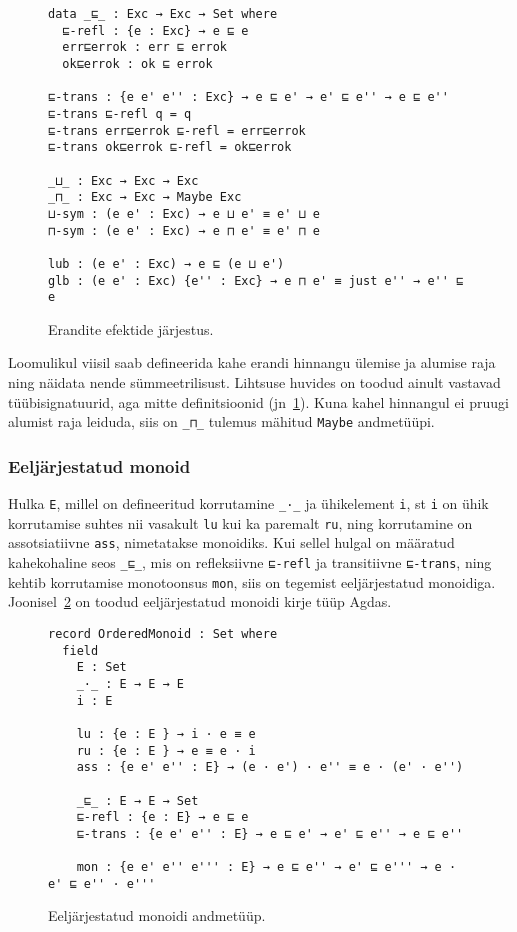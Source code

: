 \documentclass[a4paper,12pt]{article}
\begin{document}
\begin{figure}
  \begin{BVerbatim}
data _⊑_ : Exc → Exc → Set where
  ⊑-refl : {e : Exc} → e ⊑ e
  err⊑errok : err ⊑ errok
  ok⊑errok : ok ⊑ errok
  
⊑-trans : {e e' e'' : Exc} → e ⊑ e' → e' ⊑ e'' → e ⊑ e''
⊑-trans ⊑-refl q = q
⊑-trans err⊑errok ⊑-refl = err⊑errok
⊑-trans ok⊑errok ⊑-refl = ok⊑errok

_⊔_ : Exc → Exc → Exc
_⊓_ : Exc → Exc → Maybe Exc
⊔-sym : (e e' : Exc) → e ⊔ e' ≡ e' ⊔ e
⊓-sym : (e e' : Exc) → e ⊓ e' ≡ e' ⊓ e

lub : (e e' : Exc) → e ⊑ (e ⊔ e')
glb : (e e' : Exc) {e'' : Exc} → e ⊓ e' ≡ just e'' → e'' ⊑ e
  \end{BVerbatim}
  \caption{Erandite efektide järjestus.}
  \label{fig:exc.ord}
\end{figure}
Loomulikul viisil saab defineerida kahe erandi hinnangu ülemise ja alumise raja ning näidata nende sümmeetrilisust.
Lihtsuse huvides on toodud ainult vastavad tüübisignatuurid, aga mitte definitsioonid (jn~\ref{fig:exc.ord}).
Kuna kahel hinnangul ei pruugi alumist raja leiduda, siis on {\tt _⊓_} tulemus mähitud {\tt Maybe} andmetüüpi.

\subsubsection{Eeljärjestatud monoid}\label{sssec:ordered-monoid}
Hulka {\tt E}, millel on defineeritud korrutamine {\tt _·_} ja ühikelement {\tt i},
st {\tt i} on ühik korrutamise suhtes nii vasakult {\tt lu} kui ka paremalt {\tt ru},
ning korrutamine on assotsiatiivne {\tt ass}, nimetatakse monoidiks.
Kui sellel hulgal on määratud kahekohaline seos {\tt _⊑_},
mis on refleksiivne {\tt ⊑-refl} ja transitiivne {\tt ⊑-trans},
ning kehtib korrutamise monotoonsus {\tt mon},
siis on tegemist eeljärjestatud monoidiga.
Joonisel~\ref{fig:ordered-monoid} on toodud eeljärjestatud monoidi kirje tüüp Agdas.

\begin{figure}
  \begin{BVerbatim}
record OrderedMonoid : Set where
  field
    E : Set
    _·_ : E → E → E    
    i : E

    lu : {e : E } → i · e ≡ e
    ru : {e : E } → e ≡ e · i 
    ass : {e e' e'' : E} → (e · e') · e'' ≡ e · (e' · e'')
    
    _⊑_ : E → E → Set    
    ⊑-refl : {e : E} → e ⊑ e
    ⊑-trans : {e e' e'' : E} → e ⊑ e' → e' ⊑ e'' → e ⊑ e''

    mon : {e e' e'' e''' : E} → e ⊑ e'' → e' ⊑ e''' → e · e' ⊑ e'' · e'''
  \end{BVerbatim}
  \caption{Eeljärjestatud monoidi andmetüüp.}
  \label{fig:ordered-monoid}
\end{figure}
\end{document}
